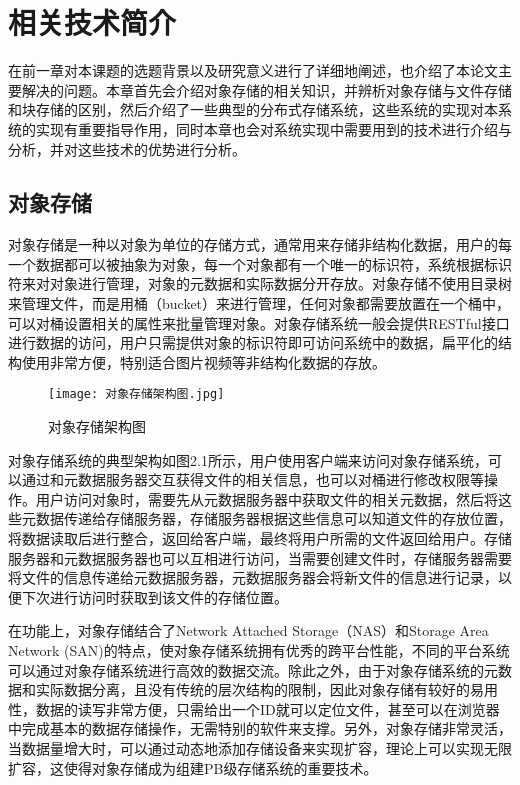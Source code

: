 
\chapter{相关技术简介}
在前一章对本课题的选题背景以及研究意义进行了详细地阐述，也介绍了本论文主要解决的问题。本章首先会介绍对象存储的相关知识，并辨析对象存储与文件存储和块存储的区别，然后介绍了一些典型的分布式存储系统，这些系统的实现对本系统的实现有重要指导作用，同时本章也会对系统实现中需要用到的技术进行介绍与分析，并对这些技术的优势进行分析。
\section{对象存储}%
对象存储是一种以对象为单位的存储方式，通常用来存储非结构化数据，用户的每一个数据都可以被抽象为对象，每一个对象都有一个唯一的标识符，系统根据标识符来对对象进行管理，对象的元数据和实际数据分开存放。对象存储不使用目录树来管理文件，而是用桶（bucket）来进行管理，任何对象都需要放置在一个桶中，可以对桶设置相关的属性来批量管理对象。对象存储系统一般会提供RESTful接口进行数据的访问，用户只需提供对象的标识符即可访问系统中的数据，扁平化的结构使用非常方便，特别适合图片视频等非结构化数据的存放。
\begin{figure}
    \centering
    \texttt{[image: 对象存储架构图.jpg]}
    \caption{对象存储架构图}
\end{figure}

对象存储系统的典型架构如图2.1所示，用户使用客户端来访问对象存储系统，可以通过和元数据服务器交互获得文件的相关信息，也可以对桶进行修改权限等操作。用户访问对象时，需要先从元数据服务器中获取文件的相关元数据，然后将这些元数据传递给存储服务器，存储服务器根据这些信息可以知道文件的存放位置，将数据读取后进行整合，返回给客户端，最终将用户所需的文件返回给用户。存储服务器和元数据服务器也可以互相进行访问，当需要创建文件时，存储服务器需要将文件的信息传递给元数据服务器，元数据服务器会将新文件的信息进行记录，以便下次进行访问时获取到该文件的存储位置。

在功能上，对象存储结合了Network Attached Storage\cite{23}（NAS）和Storage Area Network\cite{24} (SAN)的特点，使对象存储系统拥有优秀的跨平台性能\cite{25}，不同的平台系统可以通过对象存储系统进行高效的数据交流。除此之外，由于对象存储系统的元数据和实际数据分离，且没有传统的层次结构的限制，因此对象存储有较好的易用性，数据的读写非常方便，只需给出一个ID就可以定位文件，甚至可以在浏览器中完成基本的数据存储操作，无需特别的软件来支撑。另外，对象存储非常灵活，当数据量增大时，可以通过动态地添加存储设备来实现扩容，理论上可以实现无限扩容，这使得对象存储成为组建PB级存储系统的重要技术。

